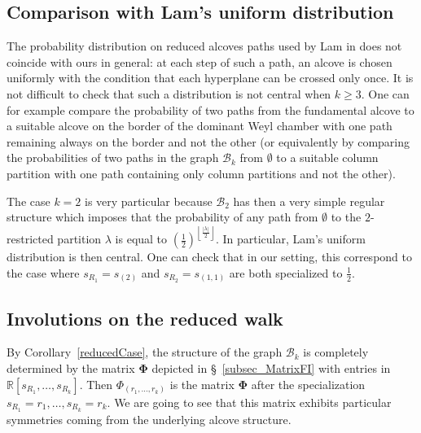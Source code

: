 \documentclass[ALCO,ThmDefs,Unicode,epreuves]{cedram}
\begin{document}
\subsection{Comparison with Lam's uniform distribution}
\label{SubSec_Compar}

The probability distribution on reduced alcoves paths used by Lam in
\cite{Lam2} does not coincide with ours in general: at each step of such a
path, an alcove is chosen uniformly with the condition that each hyperplane
can be crossed only once. It is not difficult to check that such a
distribution is not central when $k\geq3$. One can for example compare the
probability of two paths from the fundamental alcove to a suitable alcove on the
border of the dominant Weyl chamber with one path remaining always on the
border and not the other (or equivalently by comparing the probabilities of
two paths in the graph $\mathcal{B}_{k}$ from $\emptyset$ to a suitable column
partition with one path containing only column partitions and not the other).

The case $k=2$ is very particular because $\mathcal{B}_{2}$ has then a very
simple regular structure which imposes that the probability of any path from
$\emptyset$ to the $2$-restricted partition $\lambda$ is equal to $\left(
\frac{1}{2}\right) ^{\left\lfloor \frac{\left\vert \lambda\right\vert }%
	{2}\right\rfloor }$. In particular, Lam's uniform distribution is then
central. One can check that in our setting, this correspond to the case where
$s_{R_{1}}=s_{(2)}$ and $s_{R_{2}}=s_{(1,1)}$ are both specialized to
$\frac{1}{2}$.

\subsection{Involutions on the reduced walk}

\label{SubSec_Invol}

By Corollary~\ref{reducedCase}, the structure of the graph $\mathcal{B}_{k}$
is completely determined by the matrix $\mathbf{\Phi}$ depicted in \S~\ref{subsec_MatrixFI} with entries in $\mathbb{R}[s_{R_{1}},\ldots,s_{R_{k}}%
]$. Then $\Phi_{(r_{1},\ldots,r_{k})}$ is the matrix $\boldsymbol{\Phi}$ after
the specialization $s_{R_{1}}=r_{1},\ldots,s_{R_{k}}=r_{k}$. We are going to
see that this matrix exhibits particular symmetries coming from the underlying
alcove structure.
\end{document}
